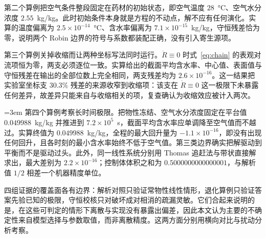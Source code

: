 第二个算例把空气条件整段固定在药材的初始状态，即空气温度 $28$~°C、空气水分浓度 $2.55$~kg/kg。此时初始条件本身就是方程的不动点，解不应有任何演化。实算的温度偏离为 $2.5\times10^{-14}$~°C、含水率偏离为 $7.1\times10^{-15}$~kg/kg，守恒残差恰为零，说明两个 Robin 边界的符号与系数都装配正确，没有引入寄生源项。

第三个算例关掉收缩而让两种坐标写法同时运行。$\dot R\equiv0$ 时式~\eqref{eq:chain} 的表观对流项恒为零，两支必须逐位一致。实算给出的截面平均含水率、中心值、表面值与守恒残差在输出的全部位数上完全相同，两支残差均为 $2.6\times10^{-16}$。这一结果把实验室坐标支 $30.3\%$ 残差的来源收窄到收缩项：该支在 $\dot R\equiv0$ 这一极限下未暴露任何差异，故差异只能来自与收缩相关的项，复查确认为收缩效应被计入两次。

{\emergencystretch=3em
第四个算例考察长时间极限。把物性冻结、空气水分浓度固定在平台值 $0.049988$~kg/kg 并推进到 $7.2\times10^5$~s，截面平均含水率应单调降至空气值而不越过。实算终值为 $0.049988$~kg/kg，全程的最大回升量为 $-1.1\times10^{-16}$，即没有出现任何回升，且各时刻的最小含水率始终不低于空气值。第三类边界确实把解驱动到平衡而不是驱动过头。此外，同一线性系统分别用 Thomas 追赶法与带状直接解求出，最大差别为 $2.2\times10^{-16}$；控制体体积之和为 $0.5000000000000001$，与解析值 $1/2$ 相差一个机器精度单位。\par}

四组证据的覆盖面各有边界：解析对照只验证常物性线性情形，退化算例只验证答案先验已知的极限，守恒校核只对破坏成对相消的疏漏灵敏。它们合起来说明的是，在这些可判定的情形下离散与实现没有暴露出偏差，因此本文认为主要的不确定性来自模型选择与参数取值，而非离散精度。这两方面分别用横向对比与扰动分析考察。
